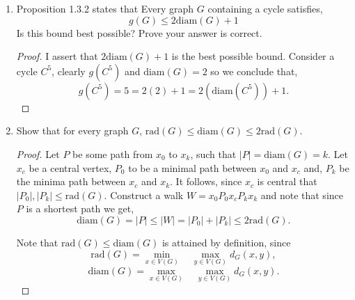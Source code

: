 \documentclass[12pt]{article}
\newcommand{\rad}{\text{rad}}
\newcommand{\diam}{\text{diam}}
\begin{document}
\begin{enumerate}
\begin{proof}
	Otherwise suppose $|V(P)\cap V(C)| < \sqrt{k}$. Note that the vertices of $V(P) \cap V(C)$ partition the $k$ edges of $P$, via $|V(P) \cap V(C)| - 1$ subpaths. Therefore must exists a subpath $P_i$ with
	terminal vertices, $x_i$ and $x_{i + 1}$ in $C$ with length at least 
	\begin{equation*}
		\dfrac{k}{|V(P) \cap V(C)| - 1} \geq \dfrac{k}{\sqrt{k} - 1}> \sqrt{k}.
	\end{equation*}
	It is clear that the path between $x_i$ and $x_{i + 1}$ through $C$, and $P_i$ form a cycle with 
	length greater than $\sqrt{k}$.
\end{proof}
\vspace{.5in}







\item Proposition 1.3.2 states that Every graph $G$ containing a cycle satisfies, 
$$g(G) \leq 2\diam(G) + 1$$ Is this bound best possible? Prove your answer is correct.
\begin{proof} I assert that $2\diam(G) + 1$ is the best possible bound. Consider a cycle $C^{5}$, clearly $g(C^5)$ and $\diam(G) = 2$ so we conclude that,
	\begin{equation*}
		g(C^5) = 5 = 2(2) + 1 = 2(\diam(C^5)) + 1.
	\end{equation*} 
\end{proof}
\vspace{.5in}


\item Show that for every graph $G$, $\rad(G) \leq \diam(G) \leq 2\rad(G).$
\begin{proof} Let $P$ be some path from $x_0$ to $x_k$, such that $|P| = \diam(G) = k$. Let
	$x_c$ be a central vertex, $P_0$ to be a minimal path between $x_0$ and $x_c$ and,
	$P_k$ be the minima path between $x_c$ and $x_k$. It follows, since $x_c$ is central 
	that $|P_0|, |P_k| \leq \rad(G)$. Construct a walk $W = x_0P_0x_cP_kx_k$ and note that since $P$ is a shortest path we get, 
	\begin{equation*}
		\diam(G) = |P| \leq |W| = |P_0| + |P_k| \leq 2\rad(G).
	\end{equation*} 

	Note that $\rad(G) \leq \diam(G)$ is attained by definition, since
	\begin{equation*}
		\rad(G) = \min_{x \in V(G)} \quad \max_{y \in V(G)} d_G(x, y),
	\end{equation*}
	\begin{equation*}
		\diam(G) = \max_{x \in V(G)} \quad \max_{y \in V(G)} d_G(x, y). 
	\end{equation*}
\end{proof}

\end{enumerate}
\end{document}
